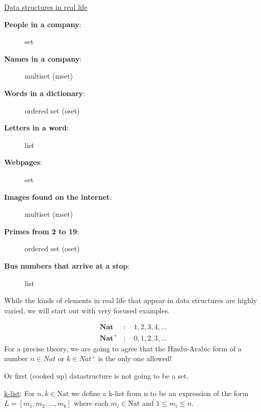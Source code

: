 \underline{Data structures in real life}

\begin{description}
    \item[\textbf{People in a company}:] set
    \item[\textbf{Names in a company}:] multiset (mset)
    \item[\textbf{Words in a dictionary}:] ordered set (oset)
    \item[\textbf{Letters in a word}:] list
    \item[\textbf{Webpages}:] set
    \item[\textbf{Images found on the internet}:] multiset (mset)
    \item[\textbf{Primes from 2 to 19}:] ordered set (oset)
    \item[\textbf{Bus numbers that arrive at a stop}:] list
\end{description}

While the kinds of elements in real life that appear in data structures are highly varied, we will start out with very focused examples.

\vspace{1em}

\[
\begin{aligned}
\textbf{Nat} &: \quad 1, 2, 3, 4, \ldots \\
\textbf{Nat}^{+} &: \quad 0, 1, 2, 3, \ldots
\end{aligned}
\]
For a precise theory, we are going to agree that the Hindu-Arabic form of a number
\( n \in Nat \) or \( k \in Nat^{+} \) is the only one allowed!


Or first (cooked up) datastructure is not going to be a set.

\begin{definition}
    \underline{k-list}: For \( n,k \in \text{Nat} \) we define a k-list from n to be an
    expression of the form \( L = [m_{1},m_{2},\dots, m_{k}] \)
where each \( m_{i} \in \text{Nat} \) and \( 1 \le m_{i} \le n \).

\end{definition}

